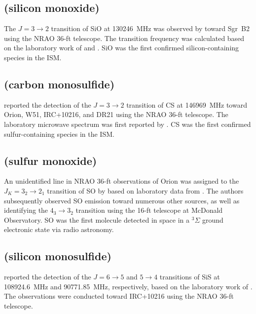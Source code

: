 \documentclass[twocolumn]{aastex631}
\begin{document}
    \subsection{ (silicon monoxide)}
    \label{SiO}
    
    The $J=3\rightarrow2$ transition of SiO at 130246~MHz was observed by \citet{Wilson:1971yn} toward Sgr~B2 using the NRAO 36-ft telescope.  The transition frequency was calculated based on the laboratory work of \citet{Raymonda:1970dt} and \citet{Torring:1968pd}.  SiO was the first confirmed silicon-containing species in the ISM.
    
    \subsection{ (carbon monosulfide)}
    \label{CS}
    
    \citet{Penzias:1971kw} reported the detection of the $J = 3\rightarrow2$ transition of CS at 146969~MHz toward Orion, W51, IRC+10216, and DR21 using the NRAO 36-ft telescope.  The laboratory microwave spectrum was first reported by \citet{Mockler:1955wl}. CS was the first confirmed sulfur-containing species in the ISM.  
    
    \subsection{ (sulfur monoxide)}
    \label{SO}
    
    An unidentified line in NRAO 36-ft observations of Orion was assigned to the $J_K = 3_2\rightarrow2_1$ transition of SO by \citet{Gottlieb:1973md} based on laboratory data from \citet{Winnewisser:1964kk}.  The authors subsequently observed SO emission toward numerous other sources, as well as identifying the $4_3\rightarrow3_2$ transition using the 16-ft telescope at McDonald Observatory.  SO was the first molecule detected in space in a $^3\Sigma$ ground electronic state via radio astronomy.
    
    \subsection{ (silicon monosulfide)}
    \label{SiS}
    
    \citet{Morris:1975im} reported the detection of the $J = 6\rightarrow5$ and $5\rightarrow4$ transitions of SiS at 108924.6~MHz and 90771.85~MHz, respectively, based on the laboratory work of \citet{Hoeft:1965fh}.  The observations were conducted toward IRC+10216 using the NRAO 36-ft telescope.
    
\end{document}
